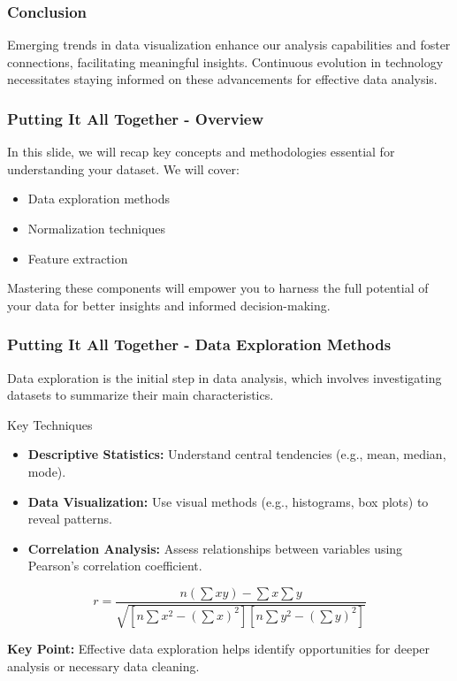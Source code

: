 \documentclass[aspectratio=169]{beamer}
\begin{document}
\begin{frame}[fragile]
    \frametitle{Conclusion}
    Emerging trends in data visualization enhance our analysis capabilities and foster connections, facilitating meaningful insights. Continuous evolution in technology necessitates staying informed on these advancements for effective data analysis.
\end{frame}

\begin{frame}[fragile]
    \frametitle{Putting It All Together - Overview}
    In this slide, we will recap key concepts and methodologies essential for understanding your dataset. We will cover:
    \begin{itemize}
        \item Data exploration methods
        \item Normalization techniques
        \item Feature extraction
    \end{itemize}
    Mastering these components will empower you to harness the full potential of your data for better insights and informed decision-making.
\end{frame}

\begin{frame}[fragile]
    \frametitle{Putting It All Together - Data Exploration Methods}
    Data exploration is the initial step in data analysis, which involves investigating datasets to summarize their main characteristics.

    \begin{block}{Key Techniques}
        \begin{itemize}
            \item \textbf{Descriptive Statistics:} Understand central tendencies (e.g., mean, median, mode).
            \item \textbf{Data Visualization:} Use visual methods (e.g., histograms, box plots) to reveal patterns.
            \item \textbf{Correlation Analysis:} Assess relationships between variables using Pearson's correlation coefficient.
        \end{itemize}
    \end{block}
    
    \begin{equation}
        r = \frac{n(\sum{xy}) - \sum{x}\sum{y}}{\sqrt{[n\sum{x^2} - (\sum{x})^2][n\sum{y^2} - (\sum{y})^2]}}
    \end{equation}
    
    \textbf{Key Point:} Effective data exploration helps identify opportunities for deeper analysis or necessary data cleaning.
\end{frame}
\end{document}
